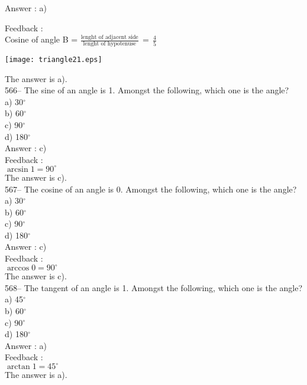 \documentclass[letterpaper, 12pt]{article}
\begin{document}
Answer : a)

Feedback : \\
Cosine of angle B = $\frac{\textrm{lenght of adjacent side}}{\textrm{lenght of hypotenuse}}\,=\,\frac{\textrm{4}}{\textrm{5}}$\\
\begin{center}
    \texttt{[image: triangle21.eps]}
    \end{center}
The answer is a).\\

566-- The sine of an angle is 1.  Amongst the following, which one is the angle?\\
a) 30$^{\circ}$\\
b) 60$^{\circ}$\\
c) 90$^{\circ}$\\
d) 180$^{\circ}$\\

Answer : c)\\

Feedback : \\
$\arcsin 1 = 90^{\circ}$\\
The answer is c).\\

567-- The cosine of an angle is 0.  Amongst the following, which one is the angle?\\
a) 30$^{\circ}$\\
b) 60$^{\circ}$\\
c) 90$^{\circ}$\\
d) 180$^{\circ}$\\

Answer : c)\\

Feedback : \\
$\arccos 0 = 90^{\circ}$\\
The answer is c).\\

568-- The tangent of an angle is 1.  Amongst the following, which one is the angle?\\
a) 45$^{\circ}$\\
b) 60$^{\circ}$\\
c) 90$^{\circ}$\\
d) 180$^{\circ}$\\

Answer : a)\\

Feedback : \\
$\arctan 1 = 45^{\circ}$\\
The answer is a).\\
\end{document}
